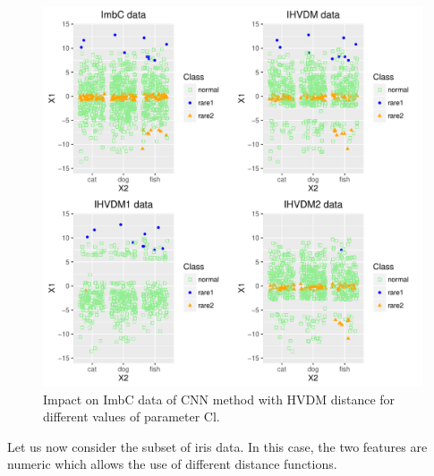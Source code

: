 \documentclass[10pt,a4paper]{article}\usepackage[]{graphicx}\usepackage[]{color}
\makeatletter
\def\maxwidth{ %
  \ifdim\Gin@nat@width>\linewidth
    \linewidth
  \else
    \Gin@nat@width
  \fi
}
\newenvironment{knitrout}{}{} %
\makeatother
\begin{document}
\begin{knitrout}\footnotesize
{}\color{fgcolor}\begin{figure}

{\centering \includegraphics[width=\maxwidth]{figures/UBL-ImbC_CNN_HVDM-1} 

}

\caption[Impact on ImbC data of CNN method with HVDM distance for different values of parameter Cl]{Impact on ImbC data of CNN method with HVDM distance for different values of parameter Cl.}\label{fig:ImbC_CNN_HVDM}
\end{figure}


\end{knitrout}


Let us now consider the subset of iris data. In this case, the two features are numeric which allows the use of different distance functions.
\end{document}
